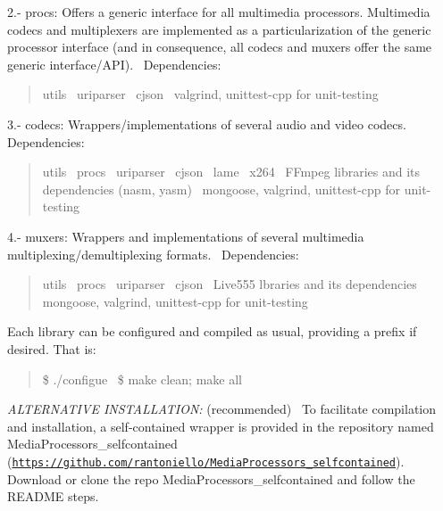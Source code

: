 2.-\/ procs\+: Offers a generic interface for all multimedia processors. Multimedia codecs and multiplexers are implemented as a particularization of the generic processor interface (and in consequence, all codecs and muxers offer the same generic interface/\+A\+PI).~\newline
 Dependencies\+: \begin{quote}
utils~\newline
 uriparser~\newline
 cjson~\newline
 valgrind, unittest-\/cpp for unit-\/testing \end{quote}


3.-\/ codecs\+: Wrappers/implementations of several audio and video codecs.~\newline
 Dependencies\+: \begin{quote}
utils~\newline
 procs~\newline
 uriparser~\newline
 cjson~\newline
 lame~\newline
 x264~\newline
 F\+Fmpeg libraries and its dependencies (nasm, yasm)~\newline
 mongoose, valgrind, unittest-\/cpp for unit-\/testing \end{quote}


4.-\/ muxers\+: Wrappers and implementations of several multimedia multiplexing/demultiplexing formats.~\newline
 Dependencies\+: \begin{quote}
utils~\newline
 procs~\newline
 uriparser~\newline
 cjson~\newline
 Live555 lbraries and its dependencies~\newline
 mongoose, valgrind, unittest-\/cpp for unit-\/testing \end{quote}


Each library can be configured and compiled as usual, providing a prefix if desired. That is\+: \begin{quote}
\$ ./configue~\newline
 \$ make clean; make all \end{quote}


{\itshape A\+L\+T\+E\+R\+N\+A\+T\+I\+VE I\+N\+S\+T\+A\+L\+L\+A\+T\+I\+ON\+:} (recommended)~\newline
 To facilitate compilation and installation, a self-\/contained wrapper is provided in the repository named \textquotesingle{}Media\+Processors\+\_\+selfcontained\textquotesingle{} (\href{https://github.com/rantoniello/MediaProcessors_selfcontained}{\tt https\+://github.\+com/rantoniello/\+Media\+Processors\+\_\+selfcontained}). Download or clone the repo \textquotesingle{}Media\+Processors\+\_\+selfcontained\textquotesingle{} and follow the R\+E\+A\+D\+ME steps.

